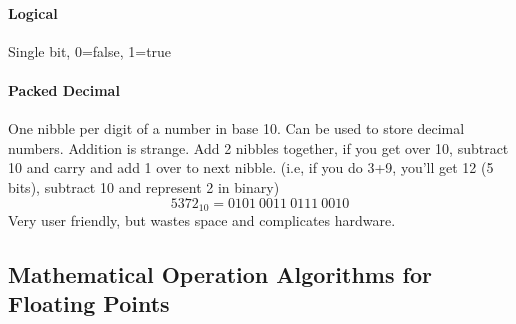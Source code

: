 \documentclass[12 pt]{article}
\begin{document}
	\paragraph{Logical}
	Single bit, 0=false, 1=true
	\paragraph{Packed Decimal}
	One nibble per digit of a number in base 10. Can be used to store decimal numbers. Addition is strange. Add 2 nibbles together, if you get over 10, subtract 10 and carry and add 1 over to next nibble. (i.e, if you do 3+9, you'll get 12 (5 bits), subtract 10 and represent 2 in binary)
	\begin{equation*}
		5372_{10}=0101 \: 0011 \: 0111 \: 0010
	\end{equation*}
	Very user friendly, but wastes space and complicates hardware.
	\subsection{Mathematical Operation Algorithms for Floating Points}
\end{document}
